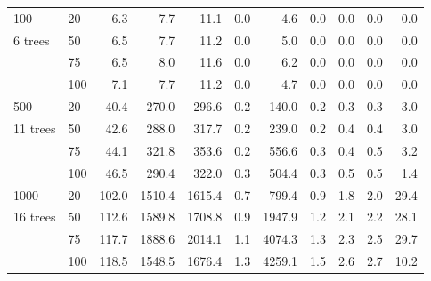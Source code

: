 \begin{table}[htb!]
\begin{tabular}{llrrrrrrrrr}
100  & 20  &     6.3 &    7.7 &              11.1 &           0.0 &            4.6 &             0.0 &                     0.0 &                0.0 &                0.0 \\
     6 trees & 50  &     6.5 &    7.7 &              11.2 &           0.0 &            5.0 &             0.0 &                     0.0 &                0.0 &                0.0 \\
     & 75  &     6.5 &    8.0 &              11.6 &           0.0 &            6.2 &             0.0 &                     0.0 &                0.0 &                0.0 \\
     & 100 &     7.1 &    7.7 &              11.2 &           0.0 &            4.7 &             0.0 &                     0.0 &                0.0 &                0.0 \\
     \hline
{500}  & 20  &    40.4 &  270.0 &             296.6 &           0.2 &          140.0 &             0.2 &                     0.3 &                0.3 &                3.0 \\
     11 trees& 50  &    42.6 &  288.0 &             317.7 &           0.2 &          239.0 &             0.2 &                     0.4 &                0.4 &                3.0 \\
     & 75  &    44.1 &  321.8 &             353.6 &           0.2 &          556.6 &             0.3 &                     0.4 &                0.5 &                3.2 \\
     & 100 &    46.5 &  290.4 &             322.0 &           0.3 &          504.4 &             0.3 &                     0.5 &                0.5 &                1.4 \\
     \hline
{1000} & 20  &   102.0 & 1510.4 &            1615.4 &           0.7 &          799.4 &             0.9 &                     1.8 &                2.0 &               29.4 \\
 16 trees    & 50  &   112.6 & 1589.8 &            1708.8 &           0.9 &         1947.9 &             1.2 &                     2.1 &                2.2 &               28.1 \\
     & 75  &   117.7 & 1888.6 &            2014.1 &           1.1 &         4074.3 &             1.3 &                     2.3 &                2.5 &               29.7 \\
     & 100 &   118.5 & 1548.5 &            1676.4 &           1.3 &         4259.1 &             1.5 &                     2.6 &                2.7 &               10.2 \\
\end{tabular}

\end{table}
